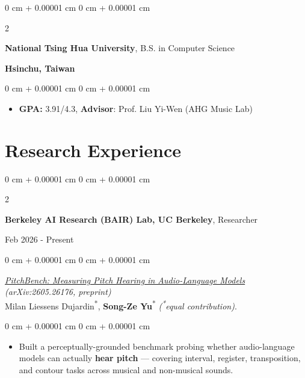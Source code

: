 \documentclass[10pt, letterpaper]{article}
\newenvironment{highlights}{
    \begin{itemize}[
        topsep=0.10 cm,
        parsep=0.10 cm,
        partopsep=0pt,
        itemsep=0pt,
        leftmargin=0 cm + 10pt
    ]
}{
    \end{itemize}
} %
\newenvironment{onecolentry}{
    \begin{adjustwidth}{
        0 cm + 0.00001 cm
    }{
        0 cm + 0.00001 cm
    }
}{
    \end{adjustwidth}
} %
\newenvironment{twocolentry}[2][]{
    \onecolentry
    \def\secondColumn{#2}
    \setcolumnwidth{\fill, 5.2 cm}
    \begin{paracol}{2}
}{
    \switchcolumn \raggedleft \secondColumn
    \end{paracol}
    \endonecolentry
} %
\begin{document}
\vspace{0.17 cm}

\begin{twocolentry}{
    \textbf{Hsinchu, Taiwan}
}
    \textbf{National Tsing Hua University}, B.S. in Computer Science
\end{twocolentry}
\vspace{0.10 cm}
\begin{onecolentry}
    \begin{highlights}
        \item \textbf{GPA:} 3.91/4.3, \textbf{Advisor}: Prof. Liu Yi-Wen (AHG Music Lab) \hfill {}
    \end{highlights}
\end{onecolentry}


 \section{Research Experience}

\begin{twocolentry}{
    Feb 2026 - Present
}
    \textbf{Berkeley AI Research (BAIR) Lab, UC Berkeley}, Researcher
\end{twocolentry}
\vspace{0.10 cm}
\begin{onecolentry}
\textit{\href{https://arxiv.org/abs/2605.26176}{PitchBench: Measuring Pitch Hearing in Audio-Language Models} (arXiv:2605.26176, preprint)}\\
\vspace{0.10 cm}
Milan Liessens Dujardin\textsuperscript{*}, \textbf{Song-Ze Yu}\textsuperscript{*} \textit{(\textsuperscript{*}equal contribution)}.
\end{onecolentry}
\vspace{0.10 cm}
\begin{onecolentry}
    \begin{highlights}
        \item Built a perceptually-grounded benchmark probing whether audio-language models can actually \textbf{hear pitch} — covering interval, register, transposition, and contour tasks across musical and non-musical sounds.
    \end{highlights}
\end{onecolentry}
\end{document}
